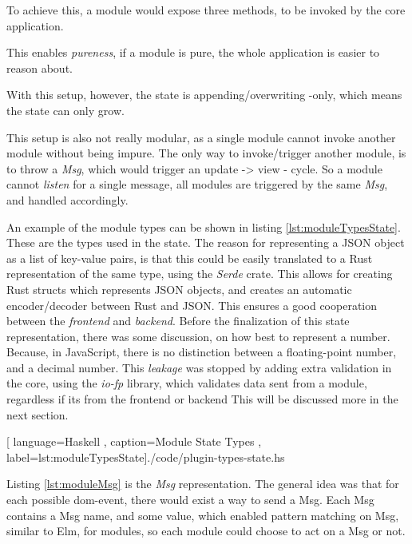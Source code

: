 To achieve this, a module would expose three methods, to be invoked by the core
application.

This enables \textit{pureness}, if a module is pure, the whole application is
easier to reason about.

With this setup, however, the state is appending/overwriting -only, which means
the state can only grow.

This setup is also not really modular, as a single module cannot invoke another
module without being impure. The only way to invoke/trigger another module, is
to throw a \textit{Msg}, which would trigger an update -> view - cycle. So
a module cannot \textit{listen} for a single message, all modules are triggered
by the same \textit{Msg}, and handled accordingly.

An example of the module types can be shown in listing
\ref{lst:moduleTypesState}. These are the types used in the state. The reason
for representing a JSON object as a list of key-value pairs, is that this could
be easily translated to a Rust representation of the same type, using the
\textit{Serde} crate. This allows for creating Rust structs which represents
JSON objects, and creates an automatic encoder/decoder between Rust and JSON.
This ensures a good cooperation between the \textit{frontend} and
\textit{backend}.
Before the finalization of this state representation, there was some
discussion, on how best to represent a number. Because, in JavaScript, there is
no distinction between a floating-point number, and a decimal number. This
\textit{leakage} was stopped by adding extra validation in the core, using the
\textit{io-fp} library, which validates data sent from a module, regardless if
its from the frontend or backend This will be discussed more in the next
section.

\begin{center}
  
    [ language=Haskell
    , caption={Module State Types}
    , label=lst:moduleTypesState]{./code/plugin-types-state.hs}
\end{center}

Listing \ref{lst:moduleMsg} is the \textit{Msg} representation. The general idea
was that for each possible \gls{dom}-event, there would exist a way to send a
Msg. Each Msg contains a Msg name, and some value, which enabled pattern
matching on Msg, similar to Elm, for modules, so each module could choose to act
on a Msg or not.

